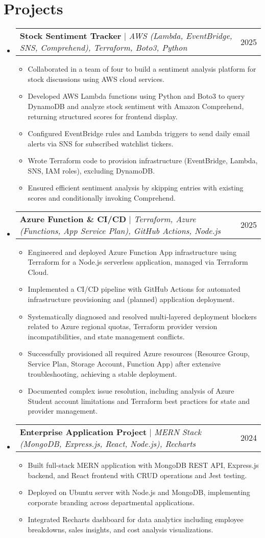\documentclass[letterpaper,11pt]{article}
\makeatletter
\newcommand{\resumeItem}[1]{
  \item\small{
    {#1 \vspace{-2pt}}
  }
}
\newcommand{\resumeProjectHeading}[2]{
    \item
    \begin{tabular*}{0.97\textwidth}{l@{\extracolsep{\fill}}r}
      \small#1 & #2 \\
    \end{tabular*}\vspace{-7pt}
}
\newcommand{\resumeSubHeadingListStart}{\begin{itemize}[leftmargin=0.15in, label={}]}
\newcommand{\resumeSubHeadingListEnd}{\end{itemize}}
\newcommand{\resumeItemListStart}{\begin{itemize}}
\newcommand{\resumeItemListEnd}{\end{itemize}\vspace{-5pt}}
\makeatother
\begin{document}
\section{Projects}
    \resumeSubHeadingListStart
    \resumeProjectHeading
        {\textbf{Stock Sentiment Tracker} $|$ \emph{AWS (Lambda, EventBridge, SNS, Comprehend), Terraform, Boto3, Python}}{2025}
        \resumeItemListStart
          \resumeItem{Collaborated in a team of four to build a sentiment analysis platform for stock discussions using AWS cloud services.}
          \resumeItem{Developed AWS Lambda functions using Python and Boto3 to query DynamoDB and analyze stock sentiment with Amazon Comprehend, returning structured scores for frontend display.}
          \resumeItem{Configured EventBridge rules and Lambda triggers to send daily email alerts via SNS for subscribed watchlist tickers.}
          \resumeItem{Wrote Terraform code to provision infrastructure (EventBridge, Lambda, SNS, IAM roles), excluding DynamoDB.}
          \resumeItem{Ensured efficient sentiment analysis by skipping entries with existing scores and conditionally invoking Comprehend.}
        \resumeItemListEnd
      \resumeProjectHeading
        {\textbf{Azure Function \& CI/CD} $|$ \emph{Terraform, Azure (Functions, App Service Plan), GitHub Actions, Node.js}}{2025}
        \resumeItemListStart
            \resumeItem{Engineered and deployed Azure Function App infrastructure using Terraform for a Node.js serverless application, managed via Terraform Cloud.}
            \resumeItem{Implemented a CI/CD pipeline with GitHub Actions for automated infrastructure provisioning and (planned) application deployment.}
            \resumeItem{Systematically diagnosed and resolved multi-layered deployment blockers related to Azure regional quotas, Terraform provider version incompatibilities, and state management conflicts.}
            \resumeItem{Successfully provisioned all required Azure resources (Resource Group, Service Plan, Storage Account, Function App) after extensive troubleshooting, achieving a stable deployment.}
            \resumeItem{Documented complex issue resolution, including analysis of Azure Student account limitations and Terraform best practices for state and provider management.}
        \resumeItemListEnd
      \resumeProjectHeading
          {\textbf{Enterprise Application Project} $|$ \emph{MERN Stack (MongoDB, Express.js, React, Node.js), Recharts}}{2024}
          \resumeItemListStart
            \resumeItem{Built full-stack MERN application with MongoDB REST API, Express.js backend, and React frontend with CRUD operations and Jest testing.}
            \resumeItem{Deployed on Ubuntu server with Node.js and MongoDB, implementing corporate branding across departmental applications.}
            \resumeItem{Integrated Recharts dashboard for data analytics including employee breakdowns, sales insights, and cost analysis visualizations.}
          \resumeItemListEnd
      \resumeSubHeadingListEnd 


\end{document}

